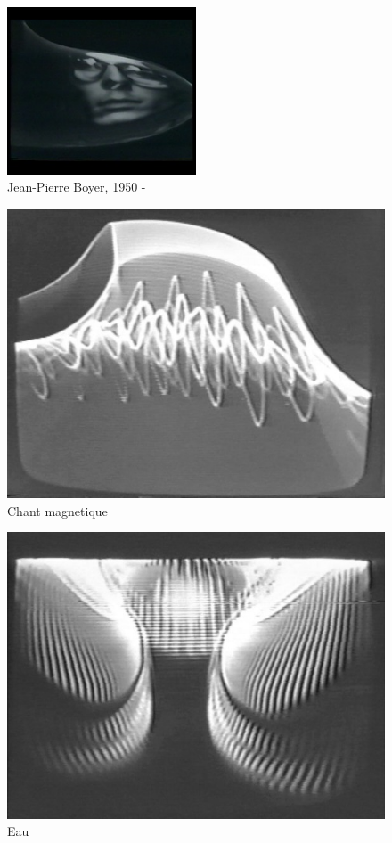 \documentclass[
  french,
]{book}
\begin{document}
\begin{figure}
\centering
\includegraphics[width=0.5\textwidth,height=\textheight]{medias/corpus/boyer/Portrait-e2288.jpg}
\caption{Jean-Pierre Boyer, 1950 -}
\end{figure}

\begin{figure}
\centering
\includegraphics{medias/corpus/boyer/Chant-magnetique.jpg}
\caption{Chant magnetique}
\end{figure}

\begin{figure}
\centering
\includegraphics{medias/corpus/boyer/Eau.jpg}
\caption{Eau}
\end{figure}
\end{document}
